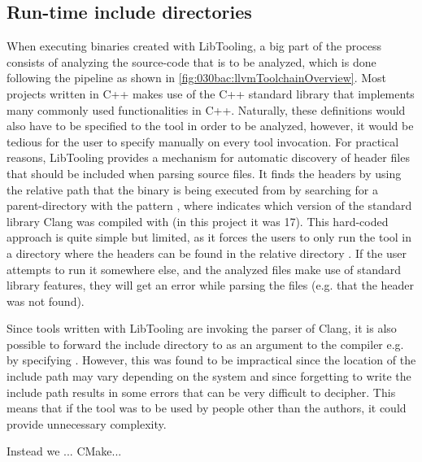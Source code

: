 \subsection{Run-time include directories}\label{subsec:080dev:rt_include}
When executing binaries created with LibTooling, a big part of the process consists of analyzing the source-code that is to be analyzed, which is done following the pipeline as shown in \cref{fig:030bac:llvmToolchainOverview}.
Most projects written in C++ makes use of the C++ standard library that implements many commonly used functionalities in C++. Naturally, these definitions would also have to be specified to the tool in order to be analyzed, however, it would be tedious for the user to specify manually on every tool invocation.
For practical reasons, LibTooling provides a mechanism for automatic discovery of header files that should be included when parsing source files. It finds the headers by using the relative path that the binary is being executed from by searching for a parent-directory with the pattern , where  indicates which version of the standard library Clang was compiled with (in this project it was 17).
This hard-coded approach is quite simple but limited, as it forces the users to only run the tool in a directory where the headers can be found in the relative directory .
If the user attempts to run it somewhere else, and the analyzed files make use of standard library features, they will get an error while parsing the files (e.g. that the header  was not found).

Since tools written with LibTooling are invoking the parser of Clang, it is also possible to forward the include directory to as an argument to the compiler e.g. by specifying .
However, this was found to be impractical since the location of the include path may vary depending on the system and since forgetting to write the include path results in some errors that can be very difficult to decipher. This means that if the tool was to be used by people other than the authors, it could provide unnecessary complexity.

Instead we ... CMake...



